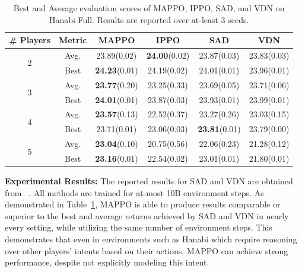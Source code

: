 \documentclass{article}
\theoremstyle{plain}
\theoremstyle{definition}
\theoremstyle{remark}
\begin{document}
\begin{table}[!t]
\centering
\begin{tabular}{cccccc} 
\toprule
\# Players         &  Metric    & MAPPO   & IPPO    & SAD         & VDN          \\
\midrule
\multirow{2}{*}{2} & Avg. & 23.89\scriptsize{(0.02)} & \textbf{24.00}\scriptsize{(0.02)} & 23.87\scriptsize{(0.03)} & 23.83\scriptsize{(0.03)}  \\
                   & Best & \textbf{24.23}\scriptsize{(0.01)} & 24.19\scriptsize{(0.02)} & 24.01\scriptsize{(0.01)} & 23.96\scriptsize{(0.01)}  \\
                    \hline
\multirow{2}{*}{3} & Avg. &   \textbf{23.77}\scriptsize{(0.20)}         & 23.25\scriptsize{(0.33)} & 23.69\scriptsize{(0.05)} & 23.71\scriptsize{(0.06)}  \\
                   & Best &   \textbf{24.01}\scriptsize{(0.01)}          & 23.87\scriptsize{(0.03)} & 23.93\scriptsize{(0.01)} & 23.99\scriptsize{(0.01)}  \\
                   \hline
\multirow{2}{*}{4} & Avg. &  \textbf{23.57}\scriptsize{(0.13)}           & 22.52\scriptsize{(0.37)} & 23.27\scriptsize{(0.26)} & 23.03\scriptsize{(0.15)}  \\
                   & Best &   23.71\scriptsize{(0.01)}          & 23.06\scriptsize{(0.03)} & \textbf{23.81}\scriptsize{(0.01)}  & 23.79\scriptsize{(0.00)}  \\
                   \hline
\multirow{2}{*}{5} & Avg. &   \textbf{23.04}\scriptsize{(0.10)}          & 20.75\scriptsize{(0.56)} & 22.06\scriptsize{(0.23)} & 21.28\scriptsize{(0.12)}  \\
                   & Best & \textbf{23.16}\scriptsize{(0.01)}            & 22.54\scriptsize{(0.02)} & 23.01\scriptsize{(0.01)} & 21.80\scriptsize{(0.01)}  \\
\bottomrule
\end{tabular}
\vspace{1mm}
\caption{Best and Average evaluation scores of MAPPO, IPPO, SAD, and VDN on Hanabi-Full. Results are reported over at-least 3 seeds.}
\label{tab:Hanabi-results}
\vspace{-6mm}
\end{table}


\textbf{Experimental Results:} The reported results for SAD and VDN are obtained from ~\cite{hu2019simplified}. All methods are trained for at-most 10B environment steps. As demonstrated in Table~\ref{tab:Hanabi-results}, MAPPO is able to produce results comparable or superior to the best and average returns achieved by SAD and VDN in nearly every setting, while utilizing the same number of environment steps. This demonstrates that even in environments such as Hanabi which require reasoning over other players' intents based on their actions, MAPPO can achieve strong performance, despite not explicitly modeling this intent.
\end{document}
